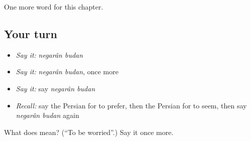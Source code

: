 \begin{grammarlens}[title={What you've built}]
One more word for this chapter.
\end{grammarlens}

\subsection*{Your turn}
\begin{itemize}
\raggedright
  \item \emph{Say it:} \emph{negarân budan}
  \item \emph{Say it:} \emph{negarân budan}, once more
  \item \emph{Say it:} say \emph{negarân budan}
  \item \emph{Recall:} say the Persian for to prefer, then the Persian for to seem, then say \emph{negarân budan} again
\end{itemize}

\begin{tcolorbox}[breakable,colback=teal!4,colframe=teal!35!black,title={Before you move on}]
What does   mean? (\textquotedblleft{}To be worried\textquotedblright{}.) Say it once more.
\end{tcolorbox}
